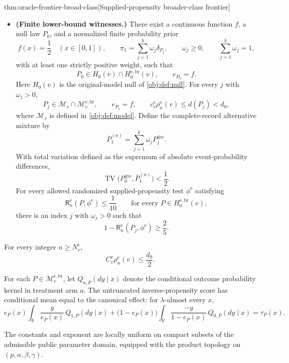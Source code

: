\documentclass[11pt]{article}
\begin{document}
\begin{theoremv}{thm:oracle-frontier-broad-class}[Supplied-propensity broader-class frontier]
\begin{itemize}
\item \textbf{(Finite lower-bound witnesses.)}
There exist a continuous function \(f\), a null law \(P_0\), and a normalized finite probability prior
\[
f(x)=\frac12\quad(x\in[0,1]),\qquad
\pi_1=\sum_{j=1}^{k}\omega_j\delta_{P_j},\qquad
\omega_j\ge0,\qquad
\sum_{j=1}^{k}\omega_j=1,
\]
with at least one strictly positive weight, such that
\[
P_0\in H_0(v)\cap H_0^{\mathrm{e,br}}(v),
\qquad e_{P_0}=f.
\]
Here \(H_0(v)\) is the original-model null of \cref{obj:def:null}.
For every \(j\) with \(\omega_j>0\),
\[
P_j\in\mathcal M_v\cap\mathcal M_v^{\mathrm{e,br}},
\qquad e_{P_j}=f,\qquad
c_v^{\mathrm e}\rho_n^{\mathrm e}(v)\le d(P_j)<d_0,
\]
where \(\mathcal M_v\) is defined in \cref{obj:def:model}.
Define the complete-record alternative mixture by
\[
\overline P_1^{(n)}
=\sum_{j=1}^{k}\omega_j P_j^{\otimes n}.
\]
With total variation defined as the supremum of absolute event-probability differences,
\[
\operatorname{TV}
\bigl(P_0^{\otimes n},\overline P_1^{(n)}\bigr)<\frac12.
\]
For every allowed randomized supplied-propensity test \(\phi^{\mathrm e}\) satisfying
\[
\mathsf R_n^{\mathrm e}(P,\phi^{\mathrm e})\le\frac1{10}
\qquad
\text{for every }P\in H_0^{\mathrm{e,br}}(v),
\]
there is an index \(j\) with \(\omega_j>0\) such that
\[
1-\mathsf R_n^{\mathrm e}(P_j,\phi^{\mathrm e})
\ge\frac25.
\]
\end{itemize}

For every integer \(n\ge N_v^{\mathrm e}\),
\[
C_v^{\mathrm e}\rho_n^{\mathrm e}(v)\le\frac{d_0}{2}.
\]

For each \(P\in\mathcal M_v^{\mathrm{e,br}}\), let
\(Q_{a,P}(dy\mid x)\) denote the conditional outcome probability kernel in treatment arm \(a\). The untruncated inverse-propensity score has conditional mean equal to the canonical effect: for \(\lambda\)-almost every \(x\),
\[
e_P(x)\int_{\mathbb R}\frac{y}{e_P(x)}\,Q_{1,P}(dy\mid x)
+
\bigl(1-e_P(x)\bigr)
\int_{\mathbb R}\frac{-y}{1-e_P(x)}\,Q_{0,P}(dy\mid x)
=\tau_P(x).
\]

The constants and exponent are locally uniform on compact subsets of the admissible public parameter domain, equipped with the product topology on \((p,\alpha,\beta,\gamma)\).
\end{theoremv}
\end{document}
